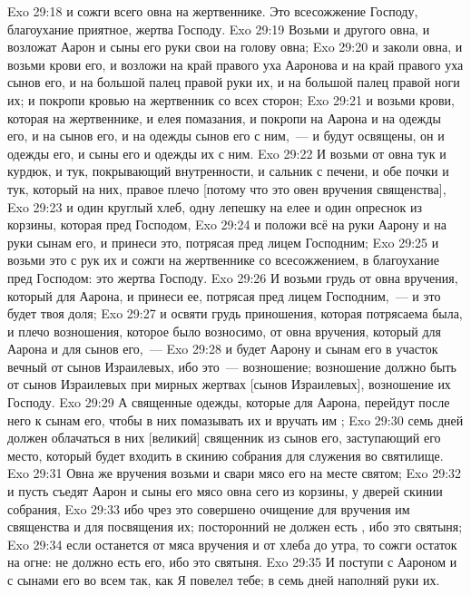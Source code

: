 \vs Exo 29:18 и сожги всего овна на жертвеннике. Это всесожжение Господу, благоухание приятное, жертва Господу.
\rsbpar\vs Exo 29:19 Возьми и другого овна, и возложат Аарон и сыны его руки свои на голову овна;
\vs Exo 29:20 и заколи овна, и возьми крови его, и возложи на край правого уха Ааронова и на край правого уха сынов его, и на большой палец правой руки их, и на большой палец правой ноги их; и покропи кровью на жертвенник со всех сторон;
\vs Exo 29:21 и возьми крови, которая на жертвеннике, и елея помазания, и покропи на Аарона и на одежды его, и на сынов его, и на одежды сынов его с ним,~--- и будут освящены, он и одежды его, и сыны его и одежды их с ним.
\vs Exo 29:22 И возьми от овна тук и курдюк, и тук, покрывающий внутренности, и сальник с печени, и обе почки и тук, который на них, правое плечо [потому что это овен вручения священства],
\vs Exo 29:23 и один круглый хлеб, одну лепешку на елее и один опреснок из корзины, которая пред Господом,
\vs Exo 29:24 и положи всё на руки Аарону и на руки сынам его, и принеси это, потрясая пред лицем Господним;
\vs Exo 29:25 и возьми это с рук их и сожги на жертвеннике со всесожжением, в благоухание пред Господом: это жертва Господу.
\vs Exo 29:26 И возьми грудь от овна вручения, который для Аарона, и принеси ее, потрясая пред лицем Господним,~--- и это будет твоя доля;
\vs Exo 29:27 и освяти грудь приношения, которая потрясаема была, и плечо возношения, которое было возносимо, от овна вручения, который для Аарона и для сынов его,~---
\vs Exo 29:28 и будет  Аарону и сынам его в участок вечный от сынов Израилевых, ибо это~--- возношение; возношение должно быть от сынов Израилевых при мирных жертвах [сынов Израилевых], возношение их Господу.
\vs Exo 29:29 А священные одежды, которые для Аарона, перейдут после него к сынам его, чтобы в них помазывать их и вручать им ;
\vs Exo 29:30 семь дней должен облачаться в них [великий] священник из сынов его, заступающий его место, который будет входить в скинию собрания для служения во святилище.
\vs Exo 29:31 Овна же вручения возьми и свари мясо его на месте святом;
\vs Exo 29:32 и пусть съедят Аарон и сыны его мясо овна сего из корзины, у дверей скинии собрания,
\vs Exo 29:33 ибо чрез это совершено очищение для вручения им священства и для посвящения их; посторонний не должен есть , ибо это святыня;
\vs Exo 29:34 если останется от мяса вручения и от хлеба до утра, то сожги остаток на огне: не должно есть его, ибо это святыня.
\vs Exo 29:35 И поступи с Аароном и с сынами его во всем так, как Я повелел тебе; в семь дней наполняй руки их.
